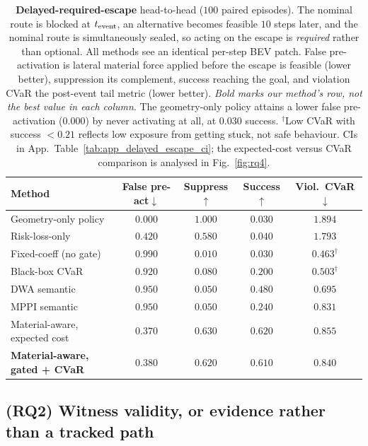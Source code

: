 \begin{table}[t]
\centering
\caption{\textbf{Delayed-required-escape} head-to-head ($100$ paired episodes).
The nominal route is blocked at $t_{\rm event}$, an alternative becomes feasible
$10$ steps later, and the nominal route is simultaneously sealed, so acting on
the escape is \emph{required} rather than optional. All methods see an identical
per-step BEV patch. False pre-activation is lateral material force applied
before the escape is feasible (lower better), suppression its complement,
success reaching the goal, and violation CVaR the post-event tail metric (lower
better). \emph{Bold marks our method's row, not the best value in each column}. The
geometry-only policy attains a lower false pre-activation ($0.000$) by never
activating at all, at $0.030$ success.
$^\dagger$Low CVaR with success ${<}0.21$ reflects low exposure from
getting stuck, not safe behaviour. CIs in
App.~Table~\ref{tab:app_delayed_escape_ci}; the expected-cost versus CVaR
comparison is analysed in Fig.~\ref{fig:rq4}.}
\label{tab:delayed_escape}
\small
\setlength{\tabcolsep}{4pt}\renewcommand{\arraystretch}{1.1}
\begin{tabular}{lcccc}
\toprule
Method & False pre-act$\downarrow$ & Suppress$\uparrow$
       & Success$\uparrow$ & Viol.\ CVaR$\downarrow$ \\
\midrule
Geometry-only policy        & $0.000$ & $1.000$ & $0.030$ & $1.894$ \\
Risk-loss-only              & $0.420$ & $0.580$ & $0.040$ & $1.793$ \\
Fixed-coeff (no gate)       & $0.990$ & $0.010$ & $0.030$ & $0.463^\dagger$ \\
Black-box CVaR              & $0.920$ & $0.080$ & $0.200$ & $0.503^\dagger$ \\
DWA semantic                & $0.950$ & $0.050$ & $0.480$ & $0.695$ \\
MPPI semantic               & $0.950$ & $0.050$ & $0.240$ & $0.831$ \\
Material-aware, expected cost & $0.370$ & $0.630$ & $0.620$ & $0.855$ \\
\textbf{Material-aware, gated + CVaR}
  & $\mathbf{0.380}$ & $\mathbf{0.620}$ & $\mathbf{0.610}$ & $\mathbf{0.840}$ \\
\bottomrule
\end{tabular}
\end{table}

\subsection{(RQ2) Witness validity, or evidence rather than a tracked path}
\label{sec:exp_rellis_dyn}

